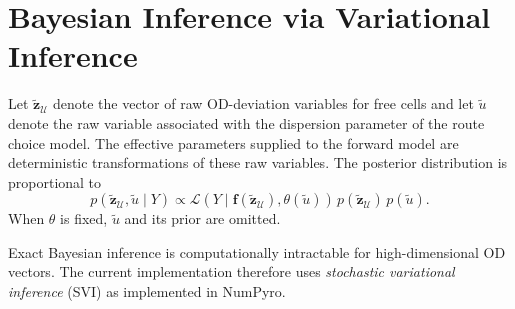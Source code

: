 \section{Bayesian Inference via Variational Inference}

Let $\widetilde{\bm z}_{\mathcal U}$ denote the vector of raw OD-deviation variables for free cells and let
$\widetilde u$ denote the raw variable associated with the dispersion parameter
of the route choice model. The effective parameters supplied to the forward model
are deterministic transformations of these raw variables.
The posterior distribution is proportional to
\[
p(\widetilde{\bm z}_{\mathcal U},\widetilde u \mid Y)
\propto
\mathcal{L}\!\left(Y \mid \bm f(\widetilde{\bm z}_{\mathcal U}),
\theta(\widetilde u)\right)\,
p(\widetilde{\bm z}_{\mathcal U})\,p(\widetilde u).
\]
When $\theta$ is fixed, $\widetilde u$ and its prior are omitted.

Exact Bayesian inference is computationally intractable for high-dimensional OD vectors.
The current implementation therefore uses \emph{stochastic variational inference} (SVI) as implemented in NumPyro.

